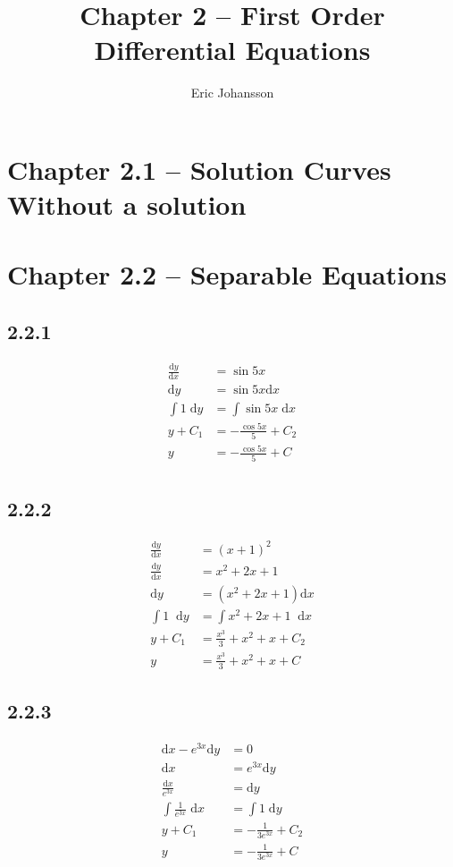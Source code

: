 \documentclass{article}
\title{Chapter 2 -- First Order Differential Equations}
\author{Eric Johansson}
\newcommand*\dif{\mathop{}\!\mathrm{d}}
\begin{document}
\maketitle
\tableofcontents
\newpage
\section{Chapter 2.1 -- Solution Curves Without a solution} 

\section{Chapter 2.2 -- Separable Equations} 

\subsection{2.2.1}
    \begin{align*}
        \frac{\mathrm{d}y}{\mathrm{d}x} &= \sin 5x \\
        \mathrm{d}y &= \sin 5x \mathrm{d}x \\
        \int 1 \; \mathrm{d}y  &= \int \sin 5x \; \mathrm{d}x \\
        y+C_1  &= -\frac{ \cos 5x}{5} + C_2 \\
        y &= -\frac{\cos 5x}{5}+C \\
    \end{align*}

\subsection{2.2.2}
\begin{align*}
    \frac{\mathrm{d}y}{\mathrm{d}x} &= \left(x+1\right)^2 \\
    \frac{\mathrm{d}y}{\mathrm{d}x} &= x^2+2x+1 \\
    \mathrm{d}y &= (x^2+2x+1) \mathrm{d}x \\
    \int 1 \dif y  &= \int x^2+2x+1 \dif x \\
    y+C_1  &=  \frac{x^3}{3}+x^2+x+C_2 \\
    y &= \frac{x^3}{3}+x^2+x+C
\end{align*}

\subsection{2.2.3}
\begin{align*}
    \mathrm{d}x-e^{3x}\mathrm{d}y &= 0 \\
    \mathrm{d}x &= e^{3x}\mathrm{d}y \\
    \frac{\mathrm{d}x}{e^{3x}} &= \mathrm{d}y \\
    \int \frac{1}{e^{3x}} \; \mathrm{d}x &= \int 1 \; \mathrm{d}y \\
    y+C_1 &= -\frac{1}{3e^{3x}}+C_2 \\
    y  &=  -\frac{1}{3e^{3x}}+C
\end{align*}
\end{document}
